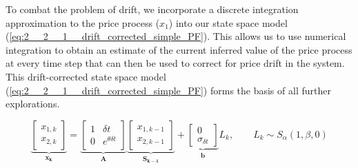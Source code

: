 \documentclass[../main.tex]{subfiles}
\begin{document}
To combat the problem of drift, we incorporate a discrete integration approximation to the price process ($x_1$) into our state space model (\autoref{eq:2__2__1__drift_corrected_simple_PF}). This allows us to use numerical integration to obtain an estimate of the current inferred value of the price process at every time step that can then be used to correct for price drift in the system. This drift-corrected state space model (\autoref{eq:2__2__1__drift_corrected_simple_PF}) forms the basis of all further explorations.

\begin{equation}
\underbrace{
	\begin{bmatrix}
	x_{1,k} \\ x_{2,k}
	\end{bmatrix}
}_{\mathbf{x_{k}}}
=
\underbrace{
	\begin{bmatrix}
	1 & \delta t \\ 0 & e^{\theta \delta t}
	\end{bmatrix}
}_{\mathbf{A}}
\underbrace{
	\begin{bmatrix}
	x_{1,k-1} \\ x_{2,k-1}
	\end{bmatrix}
}_{\mathbf{S_{k-1}}}
+ 
\underbrace{
	\begin{bmatrix}
	0 \\ \sigma_{\delta t}
	\end{bmatrix}
}_{\mathbf{b}} L_k, \qquad  L_k \sim S_\alpha (1 , \beta, 0)
\label{eq:2__2__1__drift_corrected_simple_PF}
\end{equation}
\end{document}
